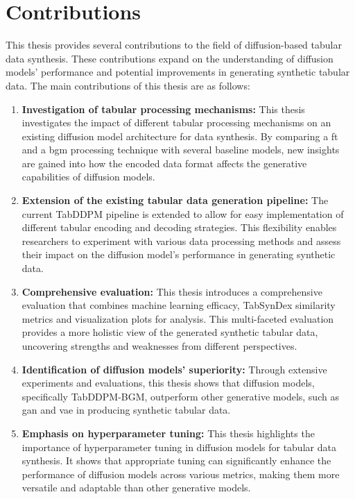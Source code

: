 \section{Contributions}
\label{ch:intro-contributions}
This thesis provides several contributions to the field of diffusion-based tabular data synthesis.
These contributions expand on the understanding of diffusion models' performance and potential improvements in generating synthetic tabular data.
The main contributions of this thesis are as follows:
\begin{enumerate}
	\item \textbf{Investigation of tabular processing mechanisms:}
	      This thesis investigates the impact of different tabular processing mechanisms on an existing diffusion model architecture for data synthesis.
	      By comparing a \gls{ft} and a \gls{bgm} processing technique with several baseline models, new insights are gained into how the encoded data format affects the generative capabilities of diffusion models.
	\item \textbf{Extension of the existing tabular data generation pipeline:}
	      The current TabDDPM \cite{kotelnikov2022TabDDPMModellingTabular} pipeline is extended to allow for easy implementation of different tabular encoding and decoding strategies.
	      This flexibility enables researchers to experiment with various data processing methods and assess their impact on the diffusion model's performance in generating synthetic data.
	\item \textbf{Comprehensive evaluation:}
	      This thesis introduces a comprehensive evaluation that combines machine learning efficacy,
	      TabSynDex similarity metrics and visualization plots for analysis.
	      This multi-faceted evaluation provides a more holistic view of the generated synthetic tabular data,
	      uncovering strengths and weaknesses from different perspectives.
	\item \textbf{Identification of diffusion models' superiority:}
	      Through extensive experiments and evaluations, this thesis shows that diffusion models, specifically TabDDPM-BGM, outperform other generative models, such as \gls{gan} and \gls{vae} in producing synthetic tabular data.
	\item \textbf{Emphasis on hyperparameter tuning:}
	      This thesis highlights the importance of hyperparameter tuning in diffusion models for tabular data synthesis.
	      It shows that appropriate tuning can significantly enhance the performance of diffusion models across various metrics,
	      making them more versatile and adaptable than other generative models.
\end{enumerate}

